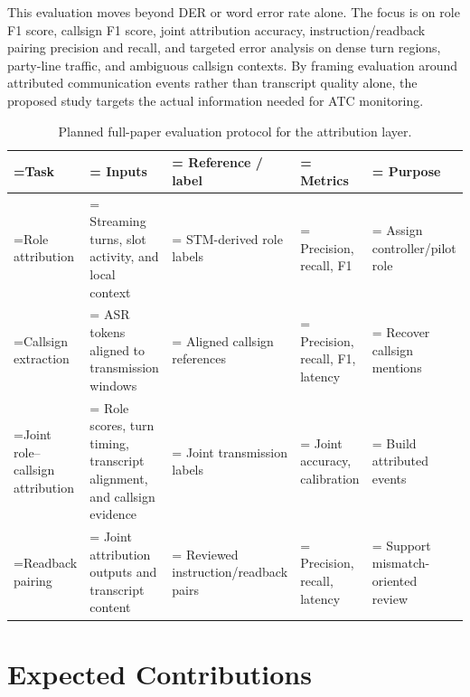 \documentclass[10pt]{article}
\renewcommand{\arraystretch}{1.08}
\begin{document}
This evaluation moves beyond DER or word error rate alone. The focus is on role F1 score, callsign F1 score, joint attribution accuracy, instruction/readback pairing precision and recall, and targeted error analysis on dense turn regions, party-line traffic, and ambiguous callsign contexts. By framing evaluation around attributed communication events rather than transcript quality alone, the proposed study targets the actual information needed for ATC monitoring.

\begin{table}[H]
\centering
\caption{Planned full-paper evaluation protocol for the attribution layer.}
\label{tab:plan}
\begingroup
\footnotesize
\setlength{\tabcolsep}{3pt}
\renewcommand{\arraystretch}{1.16}
\begin{tabularx}{\linewidth}{@{}>{\raggedright\arraybackslash\hsize=0.8\hsize\linewidth=\hsize}X>{\raggedright\arraybackslash\hsize=1.3\hsize\linewidth=\hsize}X>{\raggedright\arraybackslash\hsize=1.0\hsize\linewidth=\hsize}X>{\raggedright\arraybackslash\hsize=0.8\hsize\linewidth=\hsize}X>{\raggedright\arraybackslash\hsize=1.1\hsize\linewidth=\hsize}X@{}}
\toprule
\textbf{Task} & \textbf{Inputs} & \textbf{Reference / label} & \textbf{Metrics} & \textbf{Purpose} \\
\midrule
Role attribution & Streaming turns, slot activity, and local context & STM-derived role labels & Precision, recall, F1 & Assign controller/pilot role \\
Callsign extraction & ASR tokens aligned to transmission windows & Aligned callsign references & Precision, recall, F1, latency & Recover callsign mentions \\
Joint role--callsign attribution & Role scores, turn timing, transcript alignment, and callsign evidence & Joint transmission labels & Joint accuracy, calibration & Build attributed events \\
Readback pairing & Joint attribution outputs and transcript content & Reviewed instruction/readback pairs & Precision, recall, latency & Support mismatch-oriented review \\
\bottomrule
\end{tabularx}
\endgroup
\end{table}

\section*{Expected Contributions}
\end{document}
